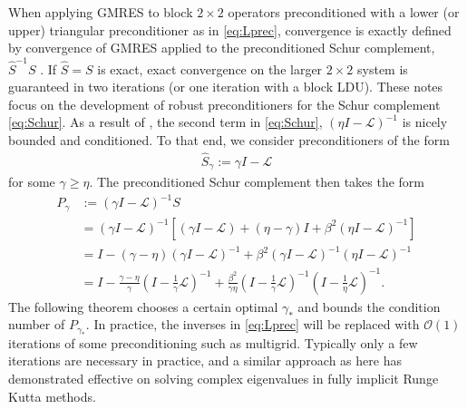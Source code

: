 \documentclass[a4paper,10pt]{article}
\begin{document}
When applying GMRES to block $2\times 2$ operators preconditioned with a lower
(or upper) triangular preconditioner as in \eqref{eq:Lprec}, convergence 
is exactly defined by convergence of GMRES applied to the preconditioned Schur
complement, $\widehat{S}^{-1}S$ \cite{2x2block}. If $\widehat{S} = S$ is exact,
exact convergence on the larger $2\times2$ system is guaranteed in two iterations
(or one iteration with a block LDU). These notes focus on the development of
robust preconditioners for the Schur complement \eqref{eq:Schur}. As a result of
, the second term in \eqref{eq:Schur},
$(\eta I - \mathcal{L})^{-1}$ is nicely bounded and conditioned.
To that end, we consider preconditioners of the form
%
\begin{align*}
\widehat{S}_\gamma := \gamma I - \mathcal{L}
\end{align*}
%
for some $\gamma \geq \eta$. The preconditioned Schur complement then takes the form
%
\begin{align}\nonumber
P_\gamma &:= (\gamma I- \mathcal{L})^{-1}S\\
& = (\gamma I - \mathcal{L})^{-1}
	\left[ (\gamma I - \mathcal{L}) + (\eta-\gamma)I + \beta^2 (\eta I - \mathcal{L})^{-1}\right] \nonumber\\
& = I - (\gamma - \eta)( \gamma I- \mathcal{L})^{-1} + 
	\beta^2( \gamma I- \mathcal{L})^{-1}
		( \eta I-\mathcal{L})^{-1} \nonumber\\
& = I - \frac{\gamma - \eta}{\gamma} ( I- \tfrac{1}{\gamma}\mathcal{L})^{-1} + 
	\frac{\beta^2}{\gamma\eta}( I- \tfrac{1}{\gamma}\mathcal{L})^{-1}
		( I- \tfrac{1}{\eta}\mathcal{L})^{-1}.\label{eq:gamma0}
\end{align}
%
The following theorem chooses a certain optimal $\gamma_*$ and bounds the
condition number of $P_{\gamma_*}$. In practice, the inverses in \eqref{eq:Lprec}
will be replaced with $\mathcal{O}(1)$ iterations of some preconditioning such
as multigrid. Typically only a few iterations are necessary in practice, and
a similar approach as here has demonstrated effective on solving complex
eigenvalues in fully implicit Runge Kutta methods.
\end{document}
